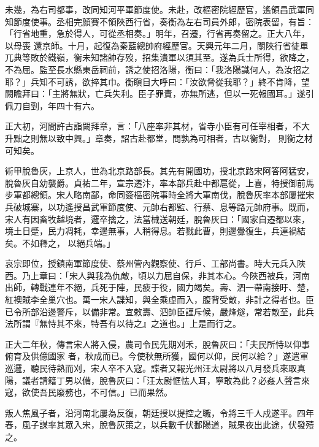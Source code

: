 \begin{pinyinscope}
 未幾，為右司都事，改同知河平軍節度使。未赴，改樞密院經歷官，遙領昌武軍同知節度使事。丞相完顏賽不領陜西行省，奏衡為左右司員外郎，密院表留，有旨：「行省地重，急於得人，可從丞相奏。」明年，召遷，行省再奏留之。正大八年，以母喪
 還京師。十月，起復為秦藍總帥府經歷官。天興元年二月，關陜行省徒單兀典等敗於鐵嶺，衡未知諸帥存歿，招集潰軍以須其至。遂為兵士所得，欲降之，不為屈。監至長水縣東岳祠前，誘之使招洛陽，衡曰：「我洛陽識何人，為汝招之耶？」兵知不可誘，欲捽其巾。衡瞋目大呼曰：「汝欲脅從我耶？」終不肯降，望闕瞻拜曰：「主將無狀，亡兵失利。臣子罪責，亦無所逃，但以一死報國耳。」遂引佩刀自剄，年四十有六。



 正大初，河間許古詣闕拜章，言：「八座率非其材，省寺小臣有可任宰相者，不大升黜之則無以致中興。」章奏，詔古赴都堂，問孰為可相者，古以衡對，
 則衡之材可知矣。



 術甲脫魯灰，上京人，世為北京路部長。其先有開國功，授北京路宋阿答阿猛安，脫魯灰自幼襲爵。貞祐二年，宣宗遷汴，率本部兵赴中都扈從，上喜，特授御前馬步軍都總領。宋人略南鄙，命同簽樞密院事時全將大軍南伐，脫魯灰率本部屢摧宋兵破城寨，以功遙授昌武軍節度使、元帥右都監、行蔡、息等路元帥府事。既而，宋人有因畜牧越境者，邏卒擒之，法當械送朝廷，脫魯灰曰：「國家自遷都以來，境土日蹙，民力凋耗，幸邊無事，人稍得息。若戮此曹，則邊釁復生，兵連禍結矣。不如釋之，
 以絕兵端。」



 哀宗即位，授鎮南軍節度使、蔡州管內觀察使、行戶、工部尚書。時大元兵入陜西。乃上章曰：「宋人與我為仇敵，頃以力屈自保，非其本心。今陜西被兵，河南出師，轉戰連年不絕，兵死于陣，民疲于役，國力竭矣。壽、泗一帶南接盱、楚，紅襖賊李全巢穴也。萬一宋人諜知，與全乘虛而入，腹背受敵，非計之得者也。臣已令所部沿邊警斥，以備非常。宜敕壽、泗帥臣謹斥候，嚴烽燧，常若敵至，此兵法所謂『無恃其不來，特吾有以待之』之道也。」上是而行之。



 正大二年秋，傳言宋人將入侵，農司令民先期刈禾，脫魯灰曰：「夫民所恃以仰事俯育及供億國家
 者，秋成而已。今使秋無所獲，國何以仰，民何以給？」遂遣軍巡邏，聽民待熟而刈，宋人卒不入寇。諜者又報光州汪太尉將以八月發兵來取真陽，議者請籍丁男以備，脫魯灰曰：「汪太尉恇怯人耳，寧敢為此？必姦人聲言來寇，欲使吾民廢務也，不可信。」已而果然。



 叛人焦風子者，沿河南北屢為反復，朝廷授以提控之職，令將三千人戍遂平。四年春，風子謀率其眾入宋，脫魯灰策之，以兵數千伏鄱陽道，賊果夜出此途，伏發殪之。




\end{pinyinscope}
